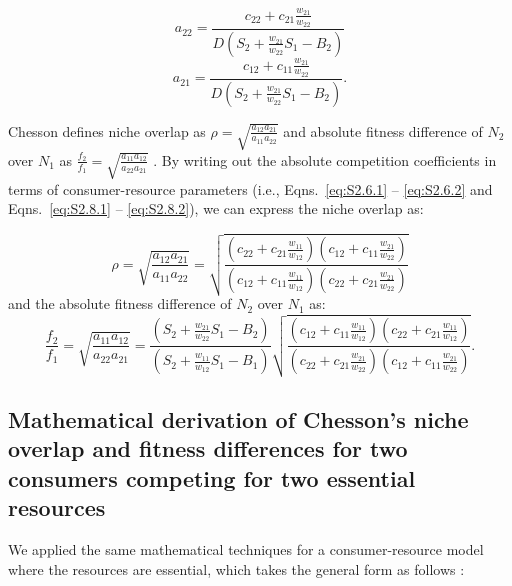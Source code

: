 \begin{equation}
{a_{22}} = \frac{{{c_{22}} + {c_{21}}\frac{{{w_{21}}}}{{{w_{22}}}}}}{{D\left( {{S_2} + \frac{{{w_{21}}}}{{{w_{22}}}}{S_1} - {B_2}} \right)}} 
\tag{S2.8.1}\label{eq:S2.8.1}
\end{equation}
\begin{equation}
{a_{21}} = \frac{{{c_{12}} + {c_{11}}\frac{{{w_{21}}}}{{{w_{22}}}}}}{{D\left( {{S_2} + \frac{{{w_{21}}}}{{{w_{22}}}}{S_1} - {B_2}} \right)}}.
\tag{S2.8.2}\label{eq:S2.8.2}
\end{equation}

Chesson defines niche overlap as $\rho=\sqrt {\frac{{{a_{12}}{a_{21}}}}{{{a_{11}}{a_{22}}}}}$ and absolute fitness difference of $N_{2}$ over $N_{1}$ as $\frac{{{f_2}}}{{{f_1}}} = \sqrt {\frac{{{a_{11}}{a_{12}}}}{{{a_{22}}{a_{21}}}}}$ \citep{Chesson2013ecosys}. By writing out the absolute competition coefficients in terms of consumer-resource parameters (i.e., Eqns.~\ref{eq:S2.6.1} -- \ref{eq:S2.6.2} and Eqns.~\ref{eq:S2.8.1} -- \ref{eq:S2.8.2}), we can express the niche overlap as: 

\begin{equation}
\rho  = \sqrt {\frac{{{a_{12}}{a_{21}}}}{{{a_{11}}{a_{22}}}}}  = \sqrt {\frac{\left (
		c_{22} + c_{21}\frac{w_{11}}{w_{12}}\right )\left ( 
		c_{12} + c_{11}\frac{w_{21}}{w_{22}} \right )}{\left (
		c_{12} + c_{11}\frac{w_{11}}{w_{12}}\right )\left ( 
		c_{22} + c_{21}\frac{w_{21}}{w_{22}} \right )}} 
\tag{S2.9}\label{eq:S2.9}
\end{equation}
and the absolute fitness difference of $N_{2}$ over $N_{1}$ as:
\begin{equation}
\frac{{{f_2}}}{{{f_1}}} = \sqrt {\frac{{{a_{11}}{a_{12}}}}{{{a_{22}}{a_{21}}}}}  = \frac{\left (S_{2}+\frac{w_{21}}{w_{22}}S_{1}-B_{2}\right )}{\left (S_{2}+\frac{w_{11}}{w_{12}}S_{1}-B_{1}\right )}\sqrt {\frac{\left (
		c_{12} + c_{11}\frac{w_{11}}{w_{12}}\right )\left ( 
		c_{22} + c_{21}\frac{w_{11}}{w_{12}} \right )}{\left (
		c_{22} + c_{21}\frac{w_{21}}{w_{22}}\right )\left ( 
		c_{12} + c_{11}\frac{w_{21}}{w_{22}} \right )}}.
\tag{S2.10}\label{eq:2.10}
\end{equation}


\subsection*{Mathematical derivation of Chesson's niche overlap and fitness differences for two consumers competing for two essential resources} 
We applied the same mathematical techniques for a consumer-resource model where the resources are essential, which takes the general form as follows \citep{tilman1982}: 

